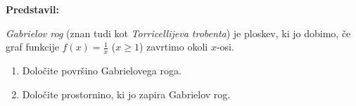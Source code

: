 \textbf{Predstavil: } 

\emph{Gabrielov rog} (znan tudi kot \emph{Torricellijeva trobenta}) je ploskev, ki jo dobimo, če graf funkcije $f(x) = \frac{1}{x}$ ($x \geq 1$) zavrtimo okoli $x$-osi. 
\begin{enumerate}
  \item Določite površino Gabrielovega roga.
  \item Določite prostornino, ki jo zapira Gabrielov rog.
\end{enumerate}